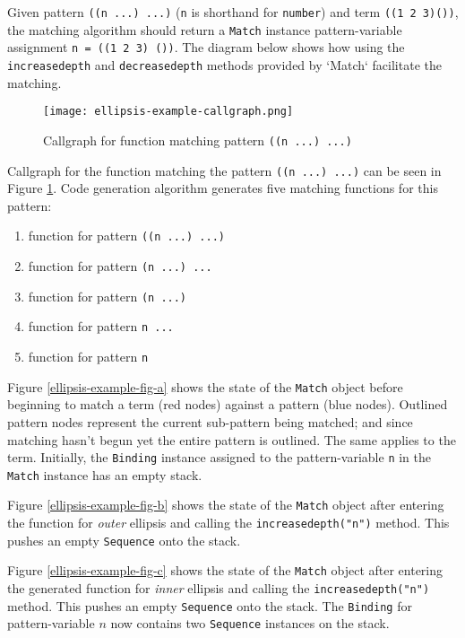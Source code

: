 
Given pattern \texttt{((n ...) ...)} (\texttt{n} is shorthand for \texttt{number}) and term \texttt{((1 2 3)())}, the matching algorithm should return a \texttt{Match} instance pattern-variable assignment \texttt{n = ((1 2 3) ())}. The diagram below shows how using the \texttt{increasedepth} and \texttt{decreasedepth} methods provided by `Match` facilitate the matching.

\begin{figure}[h]
\texttt{[image: ellipsis-example-callgraph.png]}
\caption{Callgraph for function matching pattern \texttt{((n ...) ...)}}
\label{ellipsis-example-callgraph}
\end{figure}

Callgraph for the function matching the pattern \texttt{((n ...) ...)} can be seen in Figure \ref{ellipsis-example-callgraph}. Code generation algorithm generates five matching functions for this pattern:

\begin{enumerate}
\item function for pattern \texttt{((n ...) ...)}
\item function for pattern \texttt{(n ...) ...}
\item function for pattern \texttt{(n ...) }
\item function for pattern \texttt{n ... }
\item function for pattern \texttt{n}
\end{enumerate}

Figure \ref{ellipsis-example-fig-a} shows the state of the \texttt{Match} object before beginning to match a term (red nodes) against a pattern (blue nodes). Outlined pattern nodes represent the current sub-pattern being matched; and since matching hasn't begun yet the entire pattern is outlined. The same applies to the term. Initially, the \texttt{Binding} instance assigned to the pattern-variable \texttt{n} in the \texttt{Match} instance has an empty stack.

Figure \ref{ellipsis-example-fig-b} shows the state of the \texttt{Match} object after entering the function for \textit{outer} ellipsis and calling the \texttt{increasedepth("n")} method. This pushes an empty \texttt{Sequence} onto the stack.


Figure \ref{ellipsis-example-fig-c} shows the state of the \texttt{Match} object after entering the generated function for \textit{inner} ellipsis and calling the \texttt{increasedepth("n")} method. This pushes an empty \texttt{Sequence} onto the stack. The \texttt{Binding} for pattern-variable $n$ now contains two \texttt{Sequence} instances on the stack.

